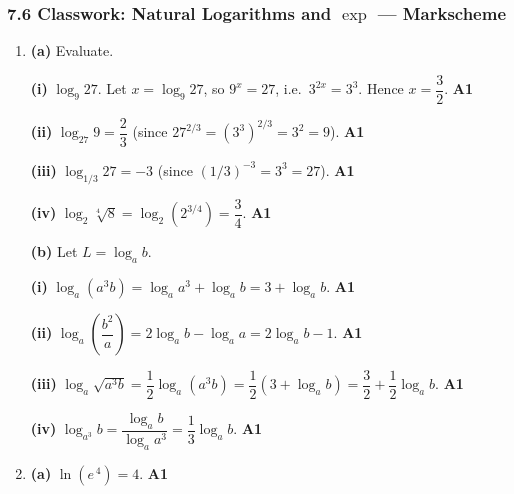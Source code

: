 \documentclass[12pt, twoside]{article}
\begin{document}
\subsubsection*{7.6 Classwork: Natural Logarithms and $\exp$ --- Markscheme}

\begin{enumerate}[itemsep=0.3cm]

\item[1.] [Maximum mark: 8]

\textbf{(a)} Evaluate.

\textbf{(i)} $\log_9 27$. \;Let $x = \log_9 27$, so $9^x = 27$, i.e.\
$3^{2x} = 3^3$. Hence $x = \dfrac{3}{2}$. \hfill \textbf{A1}

\medskip

\textbf{(ii)} $\log_{27} 9 = \dfrac{2}{3}$ \;(since
$27^{2/3} = (3^3)^{2/3} = 3^2 = 9$). \hfill \textbf{A1}

\medskip

\textbf{(iii)} $\log_{1/3} 27 = -3$ \;(since
$(1/3)^{-3} = 3^3 = 27$). \hfill \textbf{A1}

\medskip

\textbf{(iv)} $\log_2 \sqrt[4]{8} = \log_2 \!\left(2^{3/4}\right)
= \dfrac{3}{4}$. \hfill \textbf{A1}

\medskip

\textbf{(b)} Let $L = \log_a b$.

\textbf{(i)} $\log_a(a^3 b) = \log_a a^3 + \log_a b
= 3 + \log_a b$. \hfill \textbf{A1}

\medskip

\textbf{(ii)} $\log_a\!\left(\dfrac{b^2}{a}\right)
= 2\log_a b - \log_a a
= 2\log_a b - 1$. \hfill \textbf{A1}

\medskip

\textbf{(iii)} $\log_a \sqrt{a^3 b}
= \dfrac{1}{2}\log_a(a^3 b)
= \dfrac{1}{2}\!\left(3 + \log_a b\right)
= \dfrac{3}{2} + \dfrac{1}{2}\log_a b$. \hfill \textbf{A1}

\medskip

\textbf{(iv)} $\log_{a^3} b = \dfrac{\log_a b}{\log_a a^3}
= \dfrac{1}{3}\log_a b$. \hfill \textbf{A1}

\newpage

\item[2.] [Maximum mark: 5]

\textbf{(a)} $\ln\!\left(e^{\,4}\right) = 4$. \hfill \textbf{A1}


\end{enumerate}
\end{document}
